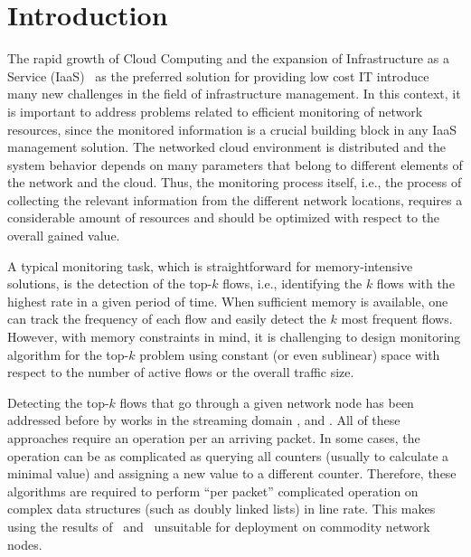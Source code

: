 \section{Introduction}
The rapid growth of Cloud Computing and the expansion of Infrastructure as a Service (IaaS)~\cite{Goyal2013} as the preferred solution for providing low cost IT introduce many new challenges in the field of infrastructure management. In this context, it is important to address problems related to efficient monitoring of network resources, since the monitored information is a crucial building block in any IaaS management solution.
The networked cloud environment is distributed and the system behavior depends on many parameters that belong to different elements of the network and the cloud. Thus, the monitoring process itself, i.e., the process of collecting the relevant information from the different network locations, requires a considerable amount of resources and should be optimized with respect to the overall gained value.

A typical monitoring task, which is straightforward for memory-intensive solutions, is the detection of the top-$k$ flows, i.e., identifying the $k$ flows with the highest rate in a given period of time. When sufficient memory is available, one can track the frequency of each flow and easily detect the $k$ most frequent flows. However, with memory constraints in mind, it is challenging to design monitoring algorithm for the top-$k$ problem using constant (or even sublinear) space with respect to the number of active flows or the overall traffic size.




Detecting the top-$k$ flows that go through a given network node has been addressed before by works in the streaming domain \cite{Demaine2002}, \cite{Metwally2005} and \cite{Ben-Basat2017}. All of these approaches require an operation per an arriving packet. In some cases, the operation can be as complicated as querying all counters (usually to calculate a minimal value) and assigning a new value to a different counter. Therefore, these algorithms are required to perform ``per packet'' complicated operation on complex data structures (such as doubly linked lists) in line rate. This makes using the results of~\cite{Demaine2002} and~\cite{Metwally2005} unsuitable for deployment on commodity network nodes.

